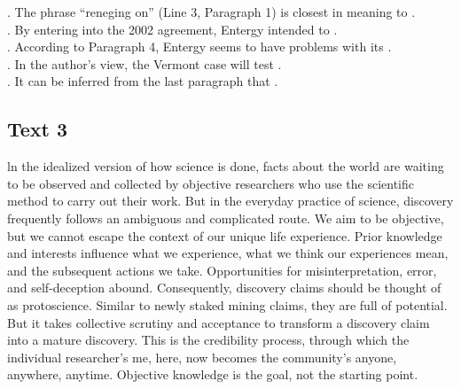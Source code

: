 \begin{questions} . The phrase “reneging on” (Line 3, Paragraph 1) is closest in meaning to        .   
   \\ . By entering into the 2002 agreement, Entergy intended to        .
   \\ . According to Paragraph 4, Entergy seems to have problems with its        .
   \\ . In the author’s view, the Vermont case will test        .
   \\ . It can be inferred from the last paragraph that         .
   \\ \end{questions}      \subsection{Text 3}
ln the idealized version of how science is done, facts about the world are waiting to be observed and collected by objective researchers who use the scientific method to carry out their work. But in the everyday practice of science, discovery frequently follows an ambiguous and complicated route. We aim to be objective, but we cannot escape the context of our unique life experience. Prior knowledge and interests influence what we experience, what we think our experiences mean, and the subsequent actions we take. Opportunities for misinterpretation, error, and self-deception abound.
Consequently, discovery claims should be thought of as protoscience. Similar to newly staked mining claims, they are full of potential. But it takes collective scrutiny and acceptance to transform a discovery claim into a mature discovery. This is the credibility process, through which the individual researcher’s me, here, now becomes the community’s anyone, anywhere, anytime. Objective knowledge is the goal, not the starting point.
